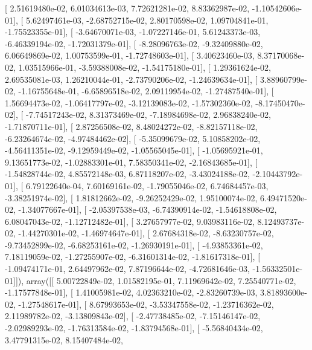 \documentclass{article}
\begin{document}
       [  2.51619480e-02,   6.01034613e-03,   7.72621281e-02,
          8.83362987e-02,  -1.10542606e-01],
       [  5.62497461e-03,  -2.68752715e-02,   2.80170598e-02,
          1.09704841e-01,  -1.75523355e-01],
       [ -3.64670071e-03,  -1.07227146e-01,   5.61243373e-03,
         -6.46339194e-02,  -1.72031379e-01],
       [ -8.28096763e-02,  -9.32409880e-02,   6.06649869e-02,
          1.00753599e-01,  -1.72748603e-01],
       [  3.40623460e-03,   8.37170068e-02,   1.03515966e-01,
         -3.59388008e-02,  -1.54175180e-01],
       [  1.29361624e-02,   2.69535081e-03,   1.26210044e-01,
         -2.73790206e-02,  -1.24639634e-01],
       [  3.88960799e-02,  -1.16755648e-01,  -6.65896518e-02,
          2.09119954e-02,  -1.27487540e-01],
       [  1.56694473e-02,  -1.06417797e-02,  -3.12139083e-02,
         -1.57302360e-02,  -8.17450470e-02],
       [ -7.74517243e-02,   8.31373469e-02,  -7.18984698e-02,
          2.96838240e-02,  -1.71870711e-01],
       [  2.87256508e-02,   8.48024272e-02,  -8.82157118e-02,
         -6.23264674e-02,  -4.97484462e-02],
       [ -5.35099679e-02,   5.10858202e-02,  -4.56411351e-02,
         -9.12959449e-02,  -1.05565045e-01],
       [ -1.05695921e-01,   9.13651773e-02,  -1.02883301e-01,
          7.58350341e-02,  -2.16843685e-01],
       [ -1.54828744e-02,   4.85572148e-03,   6.87118207e-02,
         -3.43024188e-02,  -2.10443792e-01],
       [  6.79122640e-04,   7.60169161e-02,  -1.79055046e-02,
          6.74684457e-03,  -3.38251974e-02],
       [  1.81812662e-02,  -9.26252429e-02,   1.95100074e-02,
          6.49471520e-02,  -1.34077667e-01],
       [ -2.05397538e-03,  -6.74390914e-02,  -1.54618808e-02,
          6.08047043e-02,  -1.12712482e-01],
       [  3.27657977e-02,   9.03983116e-02,   8.12493737e-02,
         -1.44270301e-02,  -1.46974647e-01],
       [  2.67684318e-02,  -8.63230757e-02,  -9.73452899e-02,
         -6.68253161e-02,  -1.26930191e-01],
       [ -4.93853361e-02,   7.18119059e-02,  -1.27255907e-02,
         -6.31601314e-02,  -1.81617318e-01],
       [ -1.09474171e-01,   2.64497962e-02,   7.87196644e-02,
         -4.72681646e-03,  -1.56332501e-01]]), array([[  5.00722849e-02,   1.01582195e-01,   7.11969642e-02,
          7.25540771e-02,  -1.17577848e-01],
       [  1.41005981e-02,   4.02363210e-02,  -2.83260739e-03,
          3.81893600e-02,  -1.27548617e-01],
       [  8.67993653e-02,  -3.53347558e-02,  -1.23716362e-02,
          2.11989782e-02,  -3.13809843e-02],
       [ -2.47738485e-02,  -7.15146147e-02,  -2.02989293e-02,
         -1.76313584e-02,  -1.83794568e-01],
       [ -5.56840434e-02,   3.47791315e-02,   8.15407484e-02,
\end{document}
